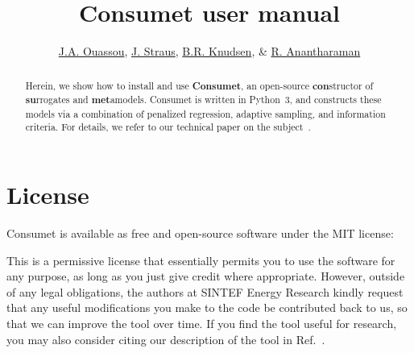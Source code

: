 \documentclass[a4paper,bibliography=numbered]{scrartcl}
\newcommand{\lstfile}[2]{}
\begin{document}
\title{Consumet user manual}
\author{\href{mailto:jabir.ouassou@sintef.no}{J.A. Ouassou},
        \href{mailto:julian.straus@sintef.no}{J. Straus},
        \href{mailto:brage.knudsen@sintef.no}{B.R. Knudsen},
     \& \href{mailto:rahul.anantharaman@sintef.no}{R. Anantharaman}}
\maketitle
\begin{abstract}
    \noindent
    Herein, we show how to install and use \textbf{Consumet}, an open-source \textbf{con}structor of \textbf{su}rrogates and \textbf{met}amodels.
    Consumet is written in Python~3, and constructs these models via a combination of penalized regression, adaptive sampling, and information criteria.
    For details, we refer to our technical paper on the subject~\cite{TechPaper}.
\end{abstract}
\tableofcontents



\newpage
\section{License}
Consumet is available as free and open-source software under the MIT license:
\lstfile{../LICENSE.md}{firstline=4}
This is a permissive license that essentially permits you to use the software for any purpose, as long as you just give credit where appropriate.
However, outside of any legal obligations, the authors at SINTEF Energy Research kindly request that any useful modifications you make to the code be contributed back to us, so that we can improve the tool over time.
If you find the tool useful for research, you may also consider citing our description of the tool in Ref.~\cite{TechPaper}.
\end{document}
